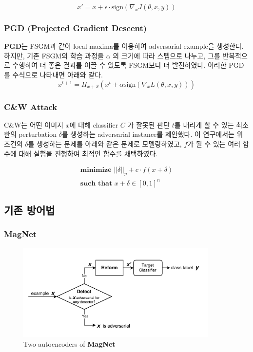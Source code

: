 \documentclass{article}
\begin{document}
\[
x' = x + \epsilon \cdot \mathrm{sign}(\nabla_x J(\theta, x, y))
\] 


\subsubsection{PGD (Projected Gradient Descent)}

\textbf{PGD}는 FSGM과 같이 local maxima를 이용하여 adversarial example을 생성한다. 하지만, 기존 FSGM의 학습 과정을 $\alpha$ 의 크기에 따라 스텝으로 나누고, 그를 반복적으로 수행하여 더 좋은 결과를 이끌 수 있도록 FSGM보다 더 발전하였다. 이러한 PGD를 수식으로 나타내면 아래와 같다. \cite{madry2017towards}
\[
x^{t+1} = \Pi_{x + \mathcal{S}} (x^t + \alpha\mathrm{sign}(\nabla_x L(\theta, x, y)))
\]

\subsubsection{C\&W Attack}
C\&W는 어떤 이미지 $x$에 대해 classifier $C$ 가 잘못된 판단 $t$를 내리게 할 수 있는 최소한의 perturbation $\delta$를 생성하는 adversarial instance를 제안했다.\cite{carlini2017towards} 이 연구에서는 위 조건의 $\delta$를 생성하는 문제를 아래와 같은 문제로 모델링하였고, $f$가 될 수 있는 여러 함수에 대해 실험을 진행하여 최적인 함수를 채택하였다.

\[
\begin{array}{c}
    \textbf{minimize } ||\delta||_p + c \cdot f(x + \delta) \\
    \textbf{such that } x + \delta \in [0, 1]^n
\end{array}
\]

\subsection{기존 방어법}

\subsubsection{MagNet}

\begin{figure}[h]
    \centering
    \includegraphics[width=10cm]{images/magnet-diagram.png}
    \caption{Two autoencoders of \textbf{MagNet} \cite{carlini2017magnet}}
\end{figure}
\end{document}
